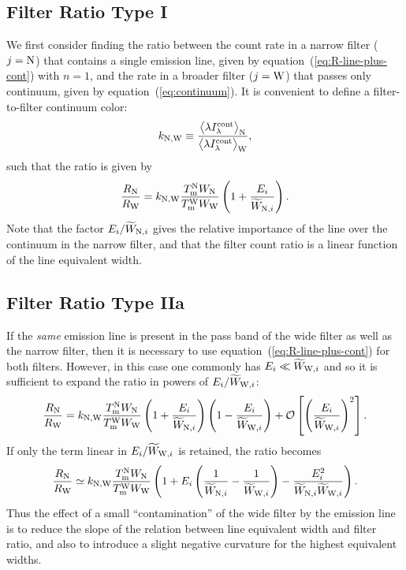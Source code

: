 \documentclass[preprint, 10pt]{aastex}
\begin{document}
\subsection{Filter Ratio Type I}
\label{sec:typeI}

We first consider finding the ratio between the count rate in a
narrow filter (\(j = \mathrm{N}\)) that contains a single emission line, 
given by equation~(\ref{eq:R-line-plus-cont}) with \(n=1\), 
and the rate in a broader filter (\(j = \mathrm{W}\)) that passes only
continuum, given by equation~(\ref{eq:continuum}). 
It is convenient to define a filter-to-filter continuum color: 
\begin{equation}
  \label{eq:cont-color}
  k_{\mathrm{N}, \mathrm{W}} \equiv \frac{\bigl\langle \lambda I_\lambda^{\mathrm{cont}} \bigr\rangle_{\mathrm{N}}}{\bigl\langle \lambda I_\lambda^{\mathrm{cont}} \bigr\rangle_{\mathrm{W}}} ,
\end{equation}
such that the ratio is given by
\begin{equation}
  \label{eq:ratio-type-I}
  \frac{R_{\mathrm{N}}}{R_{\mathrm{W}}} = 
  k_{\mathrm{N}, \mathrm{W}} \frac{T_{\mathrm{m}}^{\mathrm{N}} W_{\mathrm{N}}}{T_{\mathrm{m}}^{\mathrm{W}} W_{\mathrm{W}}}
  \left(
    1 + \frac{E_i}{\widetilde{W}_{\mathrm{N}, i}}
  \right) .
\end{equation}
Note that the factor \(E_i / \widetilde{W}_{\mathrm{N}, i}\) gives the relative
importance of the line over the continuum in the narrow filter, and
that the filter count ratio is a linear function of the line
equivalent width. 

\subsection{Filter Ratio Type IIa}
\label{sec:typeIIa}
If the \emph{same} emission line is present in the pass band of the
wide filter as well as the narrow filter, then it is necessary to use
equation~(\ref{eq:R-line-plus-cont}) for both filters.  
However, in this case one commonly has \(E_i \ll \widetilde{W}_{\mathrm{W}, i}\) and so
it is sufficient to expand the ratio in powers of \(E_i /
\widetilde{W}_{\mathrm{W}, i}\):
\begin{equation}
  \label{eq:ratio-type-II}
    \frac{R_{\mathrm{N}}}{R_{\mathrm{W}}} = 
  k_{\mathrm{N}, \mathrm{W}} \frac{T_{\mathrm{m}}^{\mathrm{N}} W_{\mathrm{N}}}{T_{\mathrm{m}}^{\mathrm{W}} W_{\mathrm{W}}}
  \left(
    1 + \frac{E_i}{\widetilde{W}_{\mathrm{N}, i}}
  \right) 
  \left(
    1 - \frac{E_i}{\widetilde{W}_{\mathrm{W}, i}}
  \right)
  + \mathcal{O}\left[ 
    \left(\frac{E_i}{\widetilde{W}_{\mathrm{W}, i}}\right)^2
  \right]
  .
\end{equation}
If only the term linear in \(E_i / \widetilde{W}_{\mathrm{W}, i}\) is retained, the
ratio becomes
\begin{equation}
  \label{eq:ratio-type-II-approx}
    \frac{R_{\mathrm{N}}}{R_{\mathrm{W}}} \simeq
  k_{\mathrm{N}, \mathrm{W}} \frac{T_{\mathrm{m}}^{\mathrm{N}} W_{\mathrm{N}}}{T_{\mathrm{m}}^{\mathrm{W}} W_{\mathrm{W}}}
  \left(
    1 + E_i \left( \frac{1}{\widetilde{W}_{\mathrm{N}, i}} - \frac{1}{\widetilde{W}_{\mathrm{W}, i}} \right)
    - \frac{E_i^2}{\widetilde{W}_{\mathrm{N}, i} \widetilde{W}_{\mathrm{W}, i}}
  \right) 
  .
\end{equation}
Thus the effect of a small ``contamination'' of the wide filter by the
emission line is to reduce the slope of the relation between line
equivalent width and filter ratio, and also to introduce a slight
negative curvature for the highest equivalent widths.
\end{document}
